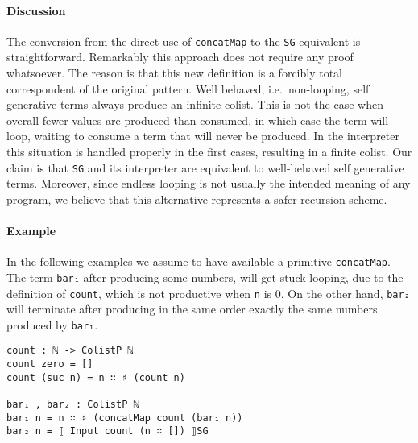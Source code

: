 \documentclass[10pt,a4paper]{article}
\begin{document}
\paragraph{Discussion}
The conversion from the direct use of \texttt{concatMap} to the \texttt{SG} equivalent is straightforward. Remarkably this approach does not require any proof whatsoever. The reason is that this new definition is a forcibly total 
correspondent of the original pattern. Well behaved, i.e.\ non-looping, self generative terms always produce an infinite colist. This is not the case when  overall fewer values are produced than consumed, in which case the term will loop, waiting to consume a term that will never be produced.
In the interpreter this situation is handled properly in the first cases, resulting in a finite colist. Our claim is that \texttt{SG} and its interpreter are equivalent to well-behaved self generative terms. Moreover, since endless looping is not usually the intended meaning of any program, we believe that this alternative represents a safer recursion scheme.

\paragraph{Example}
In the following examples we assume to have available a primitive \texttt{concatMap}. The term \texttt{bar₁} after producing some numbers, will get stuck looping, due to the definition of \texttt{count}, which is not productive when \texttt{n} is 0. On the other hand, \texttt{bar₂} will terminate after producing in the same order exactly the same numbers produced by \texttt{bar₁}.
\begin{verbatim}
count : ℕ -> ColistP ℕ
count zero = []
count (suc n) = n ∷ ♯ (count n)

bar₁ , bar₂ : ColistP ℕ
bar₁ n = n ∷ ♯ (concatMap count (bar₁ n))
bar₂ n = ⟦ Input count (n ∷ []) ⟧SG
\end{verbatim}
	
\end{document}
